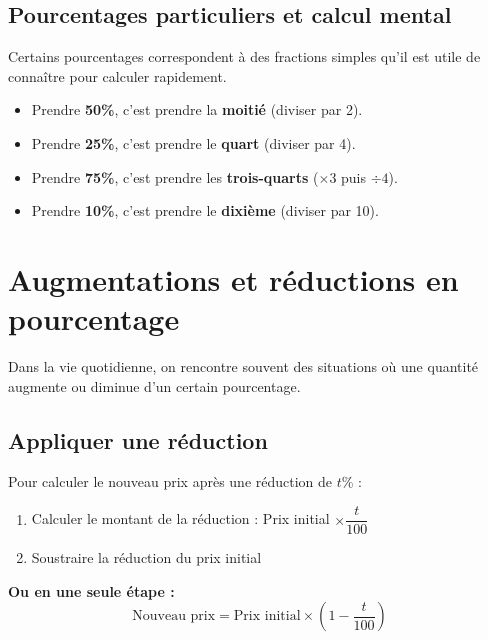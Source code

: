 \subsection{Pourcentages particuliers et calcul mental}

Certains pourcentages correspondent à des fractions simples qu'il est utile de connaître pour calculer rapidement.

\begin{summarybox}
	\begin{itemize}
		\item Prendre \textbf{50\%}, c'est prendre la \textbf{moitié} (diviser par 2).
		\item Prendre \textbf{25\%}, c'est prendre le \textbf{quart} (diviser par 4).
		\item Prendre \textbf{75\%}, c'est prendre les \textbf{trois-quarts} ($\times 3$ puis $\div 4$).
		\item Prendre \textbf{10\%}, c'est prendre le \textbf{dixième} (diviser par 10).
	\end{itemize}
\end{summarybox}

\seance

\section{Augmentations et réductions en pourcentage}

Dans la vie quotidienne, on rencontre souvent des situations où une quantité augmente ou diminue d'un certain pourcentage.

\subsection{Appliquer une réduction}

\begin{methodebox}
	Pour calculer le nouveau prix après une réduction de $t\%$ :
	\begin{enumerate}
		\item Calculer le montant de la réduction : Prix initial $\times \dfrac{t}{100}$
		\item Soustraire la réduction du prix initial
	\end{enumerate}

	\textbf{Ou en une seule étape :}
	$$\text{Nouveau prix} = \text{Prix initial} \times \left(1 - \dfrac{t}{100}\right)$$
\end{methodebox}

